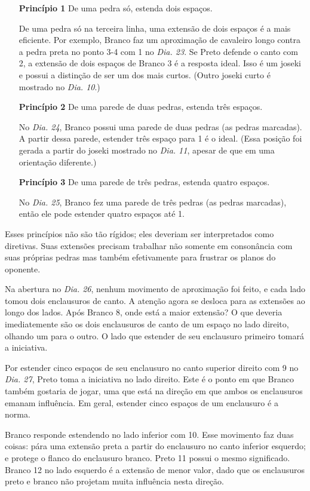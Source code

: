 \begin{itemize}
    \item[\textbf{Princípio 1}] De uma pedra só, estenda dois espaços.
        
        De uma pedra só na terceira linha, uma extensão de dois espaços é a mais eficiente. Por exemplo, Branco faz um aproximação de cavaleiro longo contra a pedra preta no ponto 3-4 com 1 no \emph{Dia. 23}. Se Preto defende o canto com 2, a extensão de dois espaços de Branco 3 é a resposta ideal. Isso é um joseki e possui a distinção de ser um dos mais curtos. (Outro joseki curto é mostrado no \emph{Dia. 10}.) 
    \item[\textbf{Princípio 2}] De uma parede de duas pedras, estenda três espaços.
    
        No \emph{Dia. 24}, Branco possui uma parede de duas pedras (as pedras marcadas). A partir dessa parede, estender três espaço para 1 é o ideal. (Essa posição foi gerada a partir do joseki mostrado no \emph{Dia. 11}, apesar de que em uma orientação diferente.)
    \item[\textbf{Princípio 3}] De uma parede de três pedras, estenda quatro espaços. 

        No \emph{Dia. 25}, Branco fez uma parede de três pedras (as pedras marcadas), então ele pode estender quatro espaços até 1.
\end{itemize}

Esses princípios não são tão rígidos; eles deveriam ser interpretados como diretivas. Suas extensões precisam trabalhar não somente em consonância com suas próprias pedras mas também efetivamente para frustrar os planos do oponente.

Na abertura no \emph{Dia. 26}, nenhum movimento de aproximação foi feito, e cada lado tomou dois enclausuros de canto. A atenção agora se desloca para as extensões ao longo dos lados. Após Branco 8, onde está a maior extensão? O que deveria imediatemente são os dois enclausuros de canto de um espaço no lado direito, olhando um para o outro. O lado que estender de seu enclausuro primeiro tomará a iniciativa.

Por estender cinco espaços de seu enclausuro no canto superior direito com 9 no \emph{Dia. 27}, Preto toma a iniciativa no lado direito. Este é o ponto em que Branco também gostaria de jogar, uma que está na direção em que ambos os enclausuros emanam influência. Em geral, estender cinco espaços de um enclausuro é a norma.

Branco responde estendendo no lado inferior com 10. Esse movimento faz duas coisas: pára uma extensão preta a partir do enclausuro no canto inferior esquerdo; e protege o flanco do enclausuro branco. Preto 11 possui o mesmo significado. Branco 12 no lado esquerdo é a extensão de menor valor, dado que os enclausuros preto e branco não projetam muita influência nesta direção.

